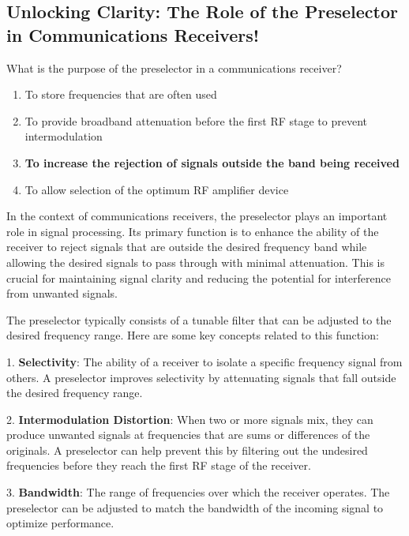 \subsection{Unlocking Clarity: The Role of the Preselector in Communications Receivers!}

\begin{tcolorbox}[colback=gray!10, colframe=black, title=E4D09]  

What is the purpose of the preselector in a communications receiver?  

\begin{enumerate}[label=\Alph*.]
    \item To store frequencies that are often used  
    \item To provide broadband attenuation before the first RF stage to prevent intermodulation  
    \item \textbf{To increase the rejection of signals outside the band being received}  
    \item To allow selection of the optimum RF amplifier device  
\end{enumerate} \end{tcolorbox}

In the context of communications receivers, the preselector plays an important role in signal processing. Its primary function is to enhance the ability of the receiver to reject signals that are outside the desired frequency band while allowing the desired signals to pass through with minimal attenuation. This is crucial for maintaining signal clarity and reducing the potential for interference from unwanted signals.

The preselector typically consists of a tunable filter that can be adjusted to the desired frequency range. Here are some key concepts related to this function:

1. \textbf{Selectivity}: The ability of a receiver to isolate a specific frequency signal from others. A preselector improves selectivity by attenuating signals that fall outside the desired frequency range.

2. \textbf{Intermodulation Distortion}: When two or more signals mix, they can produce unwanted signals at frequencies that are sums or differences of the originals. A preselector can help prevent this by filtering out the undesired frequencies before they reach the first RF stage of the receiver.

3. \textbf{Bandwidth}: The range of frequencies over which the receiver operates. The preselector can be adjusted to match the bandwidth of the incoming signal to optimize performance.

